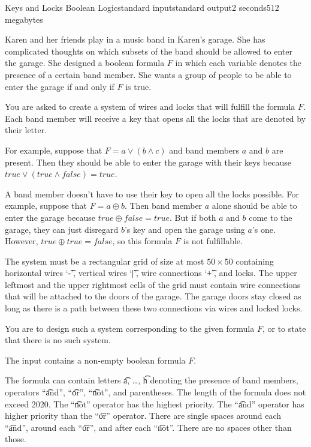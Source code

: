 \begin{problem}{Keys and Locks Boolean Logic}{standard input}{standard output}{2 seconds}{512 megabytes}

Karen and her friends play in a music band in Karen's garage. She has complicated thoughts on which subsets of the band should be allowed to enter the garage. She designed a boolean formula $F$ in which each variable denotes the presence of a certain band member. She wants a group of people to be able to enter the garage if and only if $F$ is true.

You are asked to create a system of wires and locks that will fulfill the formula $F$. Each band member will receive a key that opens all the locks that are denoted by their letter.

For example, suppose that $F = a \lor (b \land c)$ and band members $a$ and $b$ are present. Then they should be able to enter the garage with their keys because $true \lor (true \land false) = true$.

A band member doesn't have to use their key to open all the locks possible. For example, suppose that $F = a \oplus b$. Then band member $a$ alone should be able to enter the garage because $true \oplus false = true$. But if both $a$ and $b$ come to the garage, they can just disregard $b$'s key and open the garage using $a$'s one. However, $true \oplus true = false$, so this formula $F$ is not fulfillable.

The system must be a rectangular grid of size at most $50 \times 50$ containing horizontal wires `\t{-}', vertical wires `\t{|}', wire connections `\t{+}', and locks. The upper leftmost and the upper rightmost cells of the grid must contain wire connections that will be attached to the doors of the garage. The garage doors stay closed as long as there is a path between these two connections via wires and locked locks.

You are to design such a system corresponding to the given formula $F$, or to state that there is no such system.


\InputFile
The input contains a non-empty boolean formula $F$.

The formula can contain letters \t{a}, \ldots, \t{h} denoting the presence of band members, operators ``\t{and}'', ``\t{or}'', ``\t{not}'', and parentheses. The length of the formula does not exceed 2020. The ``\t{not}'' operator has the highest priority. The ``\t{and}'' operator has higher priority than the ``\t{or}'' operator. There are single spaces around each ``\t{and}'', around each ``\t{or}'', and after each ``\t{not}''. There are no spaces other than those.


\end{problem}
